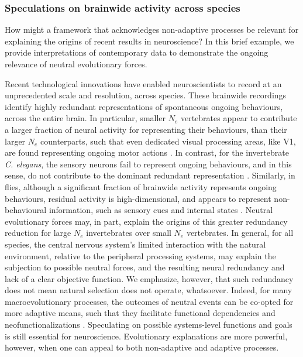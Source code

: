 \documentclass[twocolumn]{article}
\begin{document}
\subsubsection{Speculations on brainwide activity across species}
How might a framework that acknowledges non-adaptive processes be relevant for explaining the origins of recent results in neuroscience? In this brief example, we provide interpretations of contemporary data to demonstrate the ongoing relevance of neutral evolutionary forces. 

Recent technological innovations have enabled neuroscientists to record at an unprecedented scale and resolution, across species. These brainwide recordings identify highly redundant representations of spontaneous ongoing behaviours, across the entire brain. In particular, smaller $N_e$ vertebrates appear to contribute a larger fraction of neural activity for representing their behaviours, than their larger $N_e$ counterparts, such that even dedicated visual processing areas, like V1, are found representing ongoing motor actions \cite{stringer_harris_2019, kato_2015, aimon_2019, schaffer_2021, kaplan_zimmer_2020}. In contrast, for the invertebrate \textit{C. elegans}, the sensory neurons fail to represent ongoing behaviours, and in this sense, do not contribute to the dominant redundant representation \cite{kato_2015, kaplan_zimmer_2020}. Similarly, in flies, although a significant fraction of brainwide activity represents ongoing behaviours, residual activity is high-dimensional, and appears to represent non-behavioural information, such as sensory cues and internal states \cite{aimon_2019, schaffer_2021}. Neutral evolutionary forces may, in part, explain the origins of this greater redundancy reduction for large $N_e$ invertebrates over small $N_e$ vertebrates. In general, for all species, the central nervous system's limited interaction with the natural environment, relative to the peripheral processing systems, may explain the subjection to possible neutral forces, and the resulting neural redundancy and lack of a clear objective function. We emphasize, however, that such redundancy does not mean natural selection does not operate, whatsoever. Indeed, for many macroevolutionary processes, the outcomes of neutral events can be co-opted for more adaptive means, such that they facilitate functional dependencies and neofunctionalizations \cite{Lynch_2007, bruckner_2021, kebschull_luo_2020}. Speculating on possible systems-level functions and goals is still essential for neuroscience. Evolutionary explanations are more powerful, however, when one can appeal to both non-adaptive and adaptive processes. 
\end{document}
